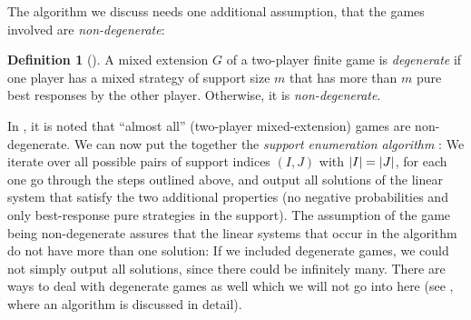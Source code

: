 \documentclass[a4paper,DIV=11]{scrreprt}
\theoremstyle{definition}
\newtheorem{defn}[thm]{Definition} %
\begin{document}
    The algorithm we discuss needs one additional assumption, that the games involved are \emph{non-degenerate}:
    \begin{defn}[{\cite[Definition 3.2]{bib:nisanAlgorithmicGameTheoryCh3EquilibriumComputation}}]
        A mixed extension $G$ of a two-player finite game is \emph{degenerate} if one player has a mixed strategy of support size $m$ that has more than $m$ pure best responses by the other player. Otherwise, it is \emph{non-degenerate}.
        \label{def:degenerateRealValuedGame}
    \end{defn}
    In \cite[p.54]{bib:nisanAlgorithmicGameTheoryCh3EquilibriumComputation}, it is noted that “almost all” (two-player mixed-extension) games are non-degenerate.
    We can now put the together the \emph{support enumeration algorithm} \cite[Algorithm 3.4]{bib:nisanAlgorithmicGameTheoryCh3EquilibriumComputation}: We iterate over all possible pairs of support indices $(I, J)$ with $\left| I \right| = \left| J \right|$, for each one go through the steps outlined above, and output all solutions of the linear system that satisfy the two additional properties (no negative probabilities and only best-response pure strategies in the support). 
    The assumption of the game being non-degenerate assures that the linear systems that occur in the algorithm do not have more than one solution: If we included degenerate games, we could not simply output all solutions, since there could be infinitely many.
    There are ways to deal with degenerate games as well which we will not go into here (see \cite[p.65]{bib:nisanAlgorithmicGameTheoryCh3EquilibriumComputation}, where an algorithm is discussed in detail).
    
\end{document}
